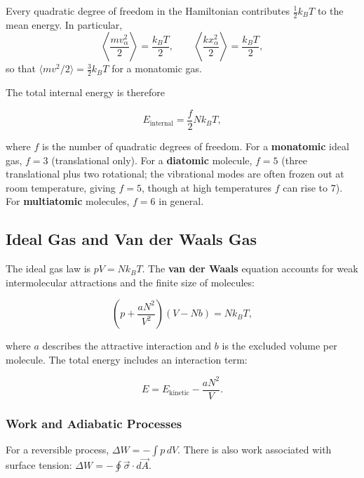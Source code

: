 \begin{theorem}
Every quadratic degree of freedom in the Hamiltonian contributes $\tfrac{1}{2}k_BT$ to the mean energy. In particular,
\begin{equation}
  \left\langle \frac{mv_\alpha^2}{2}\right\rangle = \frac{k_BT}{2}, \qquad
  \left\langle \frac{kx_\alpha^2}{2}\right\rangle = \frac{k_BT}{2},
\end{equation}
so that $\langle mv^2/2\rangle = \tfrac{3}{2}k_BT$ for a monatomic gas.
\end{theorem}

The total internal energy is therefore

\begin{equation}
  E_\text{internal} = \frac{f}{2}Nk_BT,
\end{equation}

where $f$ is the number of quadratic degrees of freedom. For a \textbf{monatomic} ideal gas, $f=3$ (translational only). For a \textbf{diatomic} molecule, $f=5$ (three translational plus two rotational; the vibrational modes are often frozen out at room temperature, giving $f=5$, though at high temperatures $f$ can rise to 7). For \textbf{multiatomic} molecules, $f=6$ in general.

\subsection{Ideal Gas and Van der Waals Gas}

The ideal gas law is $pV = Nk_BT$. The \textbf{van der Waals} equation accounts for weak intermolecular attractions and the finite size of molecules:

\begin{equation}
  \left(p + \frac{aN^2}{V^2}\right)(V - Nb) = Nk_BT,
\end{equation}

where $a$ describes the attractive interaction and $b$ is the excluded volume per molecule. The total energy includes an interaction term:

\begin{equation}
  E = E_\text{kinetic} - \frac{aN^2}{V}.
\end{equation}

\subsubsection{Work and Adiabatic Processes}

For a reversible process, $\Delta W = -\int p\,dV$. There is also work associated with surface tension: $\Delta W = -\oint \vec{\sigma}\cdot d\vec{A}$.

